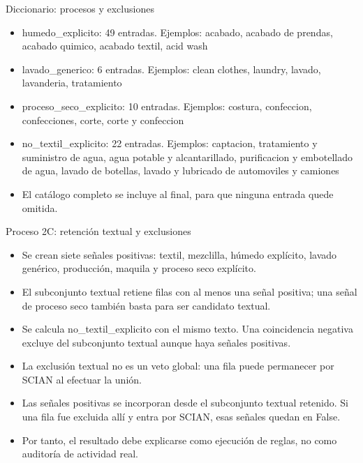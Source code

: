 \documentclass[aspectratio=169,10pt]{beamer}
\begin{document}
\begin{frame}{Diccionario: procesos y exclusiones}
\small
\begin{itemize}
\item humedo\_explicito: 49 entradas. Ejemplos: acabado, acabado de prendas, acabado quimico, acabado textil, acid wash
\item lavado\_generico: 6 entradas. Ejemplos: clean clothes, laundry, lavado, lavanderia, tratamiento
\item proceso\_seco\_explicito: 10 entradas. Ejemplos: costura, confeccion, confecciones, corte, corte y confeccion
\item no\_textil\_explicito: 22 entradas. Ejemplos: captacion, tratamiento y suministro de agua, agua potable y alcantarillado, purificacion y embotellado de agua, lavado de botellas, lavado y lubricado de automoviles y camiones
\item El catálogo completo se incluye al final, para que ninguna entrada quede omitida.
\end{itemize}
\end{frame}
\begin{frame}{Proceso 2C: retención textual y exclusiones}
\small
\begin{itemize}
\item Se crean siete señales positivas: textil, mezclilla, húmedo explícito, lavado genérico, producción, maquila y proceso seco explícito.
\item El subconjunto textual retiene filas con al menos una señal positiva; una señal de proceso seco también basta para ser candidato textual.
\item Se calcula no\_textil\_explicito con el mismo texto. Una coincidencia negativa excluye del subconjunto textual aunque haya señales positivas.
\item La exclusión textual no es un veto global: una fila puede permanecer por SCIAN al efectuar la unión.
\item Las señales positivas se incorporan desde el subconjunto textual retenido. Si una fila fue excluida allí y entra por SCIAN, esas señales quedan en False.
\item Por tanto, el resultado debe explicarse como ejecución de reglas, no como auditoría de actividad real.
\end{itemize}
\end{frame}
\end{document}
